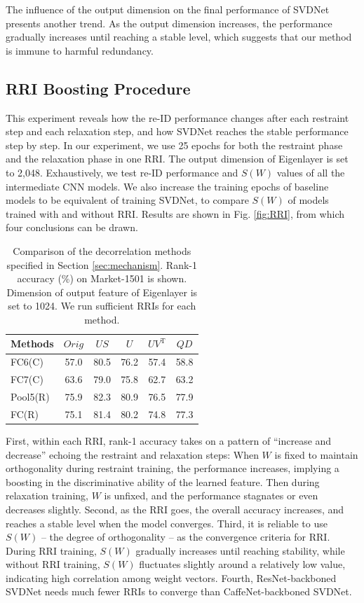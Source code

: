 \documentclass[10pt,twocolumn,letterpaper]{article}
\begin{document}
The influence of the output dimension on the final performance of SVDNet presents another trend. As the output dimension increases, the performance gradually increases until reaching a stable level, which suggests that our method is immune to harmful redundancy.

 


\subsection{RRI Boosting Procedure} \label{sec:RRI}
This experiment reveals how the re-ID performance changes after each restraint step and each relaxation step, and how SVDNet reaches the stable performance step by step. In our experiment, we use 25 epochs for both the restraint phase and the relaxation phase in one RRI. The output dimension of Eigenlayer is set to 2,048. Exhaustively, we test re-ID performance and $S(W)$ values of all the intermediate CNN models. We also increase the training epochs of baseline models to be equivalent of training SVDNet, to compare $S(W)$ of models trained with and without RRI. Results are shown in Fig. \ref{fig:RRI}, from which four conclusions can be drawn. 
\setlength{\tabcolsep}{8.3pt}
\begin{table}
\renewcommand\arraystretch{1.1}
\begin{center}
\begin{tabular}{l|ccccc}
\hline
Methods &$Orig$& $US$ & $U$ & $UV^\mathrm{T}$ & $QD$ \\
\hline
FC6(C) & 57.0 & 80.5 & 76.2 & 57.4 & 58.8\\
FC7(C) & 63.6 & 79.0 & 75.8 & 62.7 & 63.2\\
\hline
Pool5(R)&75.9 & 82.3 & 80.9 & 76.5 & 77.9\\
FC(R)   &75.1 & 81.4 &80.2  &74.8 & 77.3\\
\hline
\end{tabular}
\end{center}
\setlength{\abovecaptionskip}{0cm}
\caption{Comparison of the decorrelation methods specified in Section \ref{sec:mechanism}. Rank-1 accuracy (\%) on Market-1501 is shown. Dimension of output feature of Eigenlayer is set to 1024. We run sufficient RRIs for each method. }
\label{table:dec}
\end{table}

First, within each RRI, rank-1 accuracy takes on a pattern of ``increase and decrease'' echoing the restraint and relaxation steps: When $W$ is fixed to maintain orthogonality during restraint training, the performance increases, implying a boosting in the discriminative ability of the learned feature. Then during relaxation training, $W$ is unfixed, and the performance stagnates or even decreases slightly. Second, as the RRI goes, the overall accuracy increases, and reaches a stable level when the model converges. Third, it is reliable to use \(S(W)\) -- the degree of orthogonality --  as the convergence criteria for RRI. During RRI training, $S(W)$ gradually increases until reaching stability, while without RRI training, $S(W)$ fluctuates slightly around a relatively low value, indicating high correlation among weight vectors. Fourth, ResNet-backboned SVDNet needs much fewer RRIs to converge than CaffeNet-backboned SVDNet. 
\end{document}

